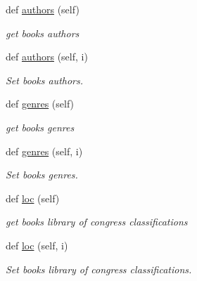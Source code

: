 \begin{DoxyCompactItemize}
def \hyperlink{classbridges_1_1data__src__dependent_1_1gutenberg__meta_1_1_gutenberg_meta_a6d855d7890d2058321310fbab782f5fd}{authors} (self)
\begin{DoxyCompactList}\small\item\em get book\textquotesingle{}s authors \end{DoxyCompactList}\item 
def \hyperlink{classbridges_1_1data__src__dependent_1_1gutenberg__meta_1_1_gutenberg_meta_a8f753bb617cfacf445285b42d1533ec2}{authors} (self, i)
\begin{DoxyCompactList}\small\item\em Set book\textquotesingle{}s authors. \end{DoxyCompactList}\item 
def \hyperlink{classbridges_1_1data__src__dependent_1_1gutenberg__meta_1_1_gutenberg_meta_a42df47578061b522d320da8da514ee6d}{genres} (self)
\begin{DoxyCompactList}\small\item\em get book\textquotesingle{}s genres \end{DoxyCompactList}\item 
def \hyperlink{classbridges_1_1data__src__dependent_1_1gutenberg__meta_1_1_gutenberg_meta_ad2f7c6f379c85433a0e9c70ff4ddc355}{genres} (self, i)
\begin{DoxyCompactList}\small\item\em Set book\textquotesingle{}s genres. \end{DoxyCompactList}\item 
def \hyperlink{classbridges_1_1data__src__dependent_1_1gutenberg__meta_1_1_gutenberg_meta_a657a3265c5a2e1770b85d78c259b6561}{loc} (self)
\begin{DoxyCompactList}\small\item\em get book\textquotesingle{}s library of congress classifications \end{DoxyCompactList}\item 
def \hyperlink{classbridges_1_1data__src__dependent_1_1gutenberg__meta_1_1_gutenberg_meta_a35841392f1965d15dbf669f33aa82b36}{loc} (self, i)
\begin{DoxyCompactList}\small\item\em Set book\textquotesingle{}s library of congress classifications. \end{DoxyCompactList}\end{DoxyCompactItemize}
